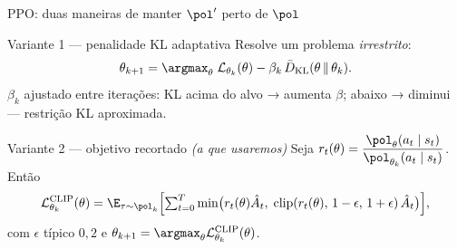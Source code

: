 \documentclass[aspectratio=169, 10pt]{beamer}
\newcommand{\thv}{\theta}
\newcommand{\thk}{\thv_k}
\newcommand{\polth}{\pol_{\thv}}
\newcommand{\polnovo}{\pol'}
\newcommand{\traj}{\tau}
\newcommand{\Ahat}{\hat{A}}
\newcommand{\Lsub}[1]{\mathcal{L}_{#1}}
\DeclareMathOperator{\clip}{clip}
\newcommand{\razao}{r_t(\thv)}
\newcommand{\Lclip}{\mathcal{L}^{\mathrm{CLIP}}}
\begin{document}
\begin{frame}{PPO: duas maneiras de manter $\polnovo$ perto de $\pol$}

  \begin{teobox}{Variante 1 --- penalidade KL adaptativa}
    Resolve um problema \emph{irrestrito}:
    \[
      \thv_{k+1} = \argmax_{\thv}\; \Lsub{\thk}(\thv)
        - \beta_k\, \bar{D}_{\mathrm{KL}}(\thv \,\|\, \thk).
    \]
    $\beta_k$ ajustado entre iterações: KL acima do alvo → aumenta $\beta$; abaixo →
    diminui --- restrição KL aproximada.
  \end{teobox}

  \vspace{-0.4em}
  \begin{teobox}{Variante 2 --- objetivo recortado \emph{(a que usaremos)}}
    Seja $\razao = \dfrac{\polth(a_t\mid s_t)}{\pol_{\thk}(a_t\mid s_t)}$. Então
    \[
      \Lclip_{\thk}(\thv) = \E_{\traj\sim\pol_k}
        \Bigl[\textstyle\sum_{t=0}^{T}
          \min\bigl(\razao \Ahat_t,\;
          \clip(\razao,\,1-\epsilon,\,1+\epsilon)\,\Ahat_t\bigr)\Bigr],
    \]
    com $\epsilon$ típico $0{,}2$ e $\thv_{k+1} = \argmax_{\thv}\Lclip_{\thk}(\thv)$.
  \end{teobox}
\end{frame}
\end{document}
